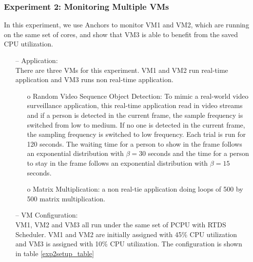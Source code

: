 \subsubsection{Experiment 2: Monitoring Multiple VMs}

\hfill \linebreak
In this experiment, we use Anchors to monitor VM1 and VM2, which are running on the same set of cores, and show that VM3 is able to benefit from the saved CPU utilization.


\begin{itemize} 
\item[--] Application:\\
There are three VMs for this experiment. VM1 and VM2 run real-time application and VM3 runs non real-time application. 
\begin{itemize} 
\item[o] Random Video Sequence Object Detection: To mimic a real-world video surveillance application, this real-time application read in video streams and if a person is detected in the current frame, the sample frequency is switched from low to medium. If no one is detected in the current frame, the sampling frequency is switched to low frequency. Each trial is run for 120 seconds. The waiting time for a person to show in the frame follows an exponential distribution with $\beta=30$ seconds and the time for a person to stay in the frame follows an exponential distribution with $\beta=15$ seconds. 
\item[o] Matrix Multiplication: a non real-tie application doing loops of 500 by 500 matrix multiplication.
\end{itemize} 


\item[--] VM Configuration:\\
VM1, VM2 and VM3 all run under the same set of PCPU with RTDS Scheduler. VM1 and VM2 are initially assigned with 45\% CPU utilization and VM3 is assigned with 10\% CPU utilization. The configuration is shown in table \ref{exp2setup_table}


\end{itemize}
